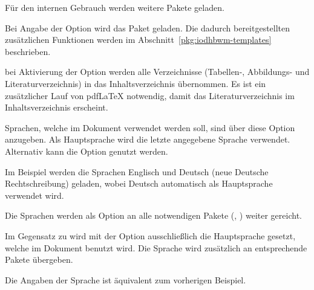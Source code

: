 \documentclass[babel=ngerman,highlight=false]{skdoc}
\begin{document}
                \noindent Für den internen Gebrauch werden weitere Pakete geladen.\medskip

                Bei Angabe der Option wird das Paket  geladen. Die dadurch bereitgestellten zusätzlichen Funktionen werden im Abschnitt~\ref{pkg:iodhbwm-templates} beschrieben.\medskip

                bei Aktivierung der Option werden alle Verzeichnisse (Tabellen-, Abbildungs- und Literaturverzeichnis) in das Inhaltsverzeichnis übernommen. Es ist ein zusätzlicher Lauf von pdf\LaTeX{} notwendig, damit das Literaturverzeichnis im Inhaltsverzeichnis erscheint.
                \medskip

                Sprachen, welche im Dokument verwendet werden soll, sind über diese Option anzugeben. Als Hauptsprache wird die letzte angegebene Sprache verwendet. Alternativ kann die Option  genutzt werden.

                Im Beispiel werden die Sprachen Englisch und Deutsch (neue Deutsche Rechtschreibung) geladen, wobei Deutsch automatisch als Hauptsprache verwendet wird.

                Die Sprachen werden als Option an alle notwendigen Pakete (, ) weiter gereicht.\medskip

                \medskip
                Im Gegensatz zu  wird mit der Option ausschließlich die Hauptsprache gesetzt, welche im Dokument benutzt wird. Die Sprache wird zusätzlich an entsprechende Pakete übergeben.

                Die Angaben der Sprache ist äquivalent zum vorherigen Beispiel.\medskip
\end{document}
